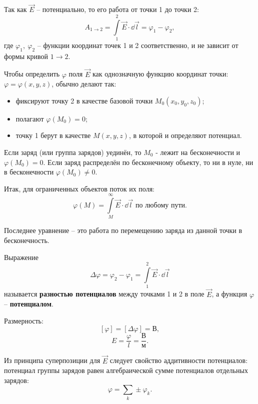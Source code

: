     Так как \( \vec{E} \) -- потенциально, то его работа от точки 1 до точки 2:
    \[
        A_{1\to2} = \int\limits_1^2 \vec{E}\cdot\dd\vec{l} =
        \varphi_1 - \varphi_2,
    \]
    где \( \varphi_1,\ \varphi_2 \) -- функции координат точек 1 и 2 
    соответственно, и не зависит от формы кривой \( 1 \rightarrow 2 \).
    
    Чтобы определить \( \varphi \) поля \( \vec{E} \) как однозначную функцию 
    координат точки: \( \varphi = \varphi(x, y, z) \), обычно делают так:
    \begin{itemize}
        \item фиксируют точку 2 в качестве базовой точки \(M_0(x_0, y_0, z_0)\);
        \item полагают \( \varphi(M_0) = 0 \);
        \item точку 1 берут в качестве \( M(x, y, z) \), в которой и определяют 
            потенциал.
    \end{itemize}
    
    Если заряд (или группа зарядов) уединён, то \( M_0 \) - лежит на 
    бесконечности и \( \varphi(M_0) = 0 \). Если заряд распределён по 
    бесконечному объекту, то ни в нуле, ни в бесконечности
    \( \varphi(M_0) \ne 0 \).
    
    Итак, для ограниченных объектов поток их поля:
    \[
        \varphi(M) = \int\limits_M^{\infty} \vec{E}\cdot\dd\vec{l}
        \text{\ по любому пути}.
    \]
    
    Последнее уравнение -- это работа по перемещению заряда из данной точки в 
    бесконечность.
    
    \begin{definition}
        Выражение
        \[
            \Delta\varphi = \varphi_2 - \varphi_1 = \int\limits_1^2 
            \vec{E}\cdot\dd\vec{l}
        \]
        называется \textbf{разностью потенциалов} между точками 1 и 2 в поле
        \( \vec{E} \), а функция \( \varphi \) -- \textbf{потенциалом}.
    \end{definition}
    
    Размерность:
    \[
        [\varphi] = [\Delta\varphi] = \text{В},
    \]
    \[
        E = \frac{\varphi}{l} = \frac{\text{В}}{\text{м}}.
    \]
    
    Из принципа суперпозиции для \( \vec{E} \) следует свойство аддитивности 
    потенциалов: потенциал группы зарядов равен алгебраической сумме 
    потенциалов отдельных зарядов:
    \[
        \varphi = \sum\limits_k \pm \varphi_{k}.
    \]
    
